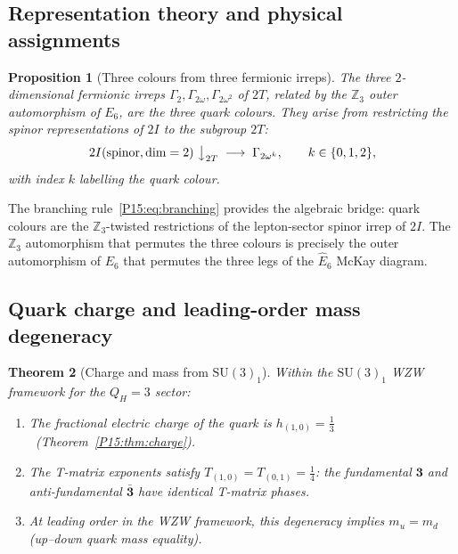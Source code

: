\documentclass[11pt,a4paper]{article}
\newtheorem{theorem}{Theorem}[section]
\newtheorem{proposition}[theorem]{Proposition}
\theoremstyle{definition}\newtheorem{definition}[theorem]{Definition}
\theoremstyle{remark}
\newcommand{\SU}{\mathrm{SU}}
\newcommand{\twoI}{2I}
\newcommand{\twoT}{2T}
\newcommand{\QH}{Q_H}
\begin{document}
\subsection{Representation theory and physical assignments}

\begin{proposition}[Three colours from three fermionic irreps]
\label{P15:prop:colours}
The three $2$-dimensional fermionic irreps
$\Gamma_2,\Gamma_{2\omega},\Gamma_{2\omega^2}$ of $\twoT$,
related by the $\mathbb{Z}_3$ outer automorphism of $E_6$,
are the three quark colours.
They arise from restricting the spinor representations of $\twoI$
to the subgroup $\twoT$:
\begin{equation}
  \twoI(\text{spinor}, \dim=2)\;\big\downarrow_{\twoT}\;
  \longrightarrow\; \Gamma_{2\omega^k},
  \qquad k\in\{0,1,2\},
  \label{P15:eq:branching}
\end{equation}
with index $k$ labelling the quark colour.
\end{proposition}

The branching rule~\eqref{P15:eq:branching} provides the algebraic
bridge: quark colours are the $\mathbb{Z}_3$-twisted restrictions
of the lepton-sector spinor irrep of $\twoI$.
The $\mathbb{Z}_3$ automorphism that permutes the three colours
is precisely the outer automorphism of $E_6$ that permutes the
three legs of the $\widehat{E}_6$ McKay diagram.

\subsection{Quark charge and leading-order mass degeneracy}

\begin{theorem}[Charge and mass from $\SU(3)_1$]
\label{P15:thm:massdegen}
Within the $\SU(3)_1$ WZW framework for the $\QH=3$ sector:
\begin{enumerate}[noitemsep,label=(\roman*)]
\item The fractional electric charge of the quark is
  $h_{(1,0)}=\tfrac{1}{3}$~(Theorem~\ref{P15:thm:charge}).
\item The T-matrix exponents satisfy
  $T_{(1,0)}=T_{(0,1)}=\tfrac{1}{4}$: the fundamental
  $\mathbf{3}$ and anti-fundamental $\bar{\mathbf{3}}$ have
  identical T-matrix phases.
\item At leading order in the WZW framework, this degeneracy
  implies $m_u=m_d$ (up--down quark mass equality).
\end{enumerate}
\end{theorem}
\end{document}
